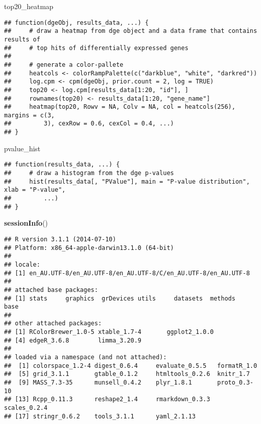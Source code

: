 \documentclass[]{article}
\newenvironment{Shaded}{\begin{snugshade}}{\end{snugshade}}
\newcommand{\KeywordTok}[1]{\textcolor[rgb]{0.13,0.29,0.53}{\textbf{{#1}}}}
\newcommand{\NormalTok}[1]{{#1}}
\begin{document}
\begin{Shaded}
\begin{Highlighting}[]
\NormalTok{top20_heatmap}
\end{Highlighting}
\end{Shaded}

\begin{verbatim}
## function(dgeObj, results_data, ...) {
##     # draw a heatmap from dge object and a data frame that contains results of
##     # top hits of differentially expressed genes
##     
##     # generate a color-pallete
##     heatcols <- colorRampPalette(c("darkblue", "white", "darkred"))
##     log.cpm <- cpm(dgeObj, prior.count = 2, log = TRUE)
##     top20 <- log.cpm[results_data[1:20, "id"], ]
##     rownames(top20) <- results_data[1:20, "gene_name"]
##     heatmap(top20, Rowv = NA, Colv = NA, col = heatcols(256), margins = c(3, 
##         3), cexRow = 0.6, cexCol = 0.4, ...)
## }
\end{verbatim}

\begin{Shaded}
\begin{Highlighting}[]
\NormalTok{pvalue_hist}
\end{Highlighting}
\end{Shaded}

\begin{verbatim}
## function(results_data, ...) {
##     # draw a histogram from the dge p-values
##     hist(results_data[, "PValue"], main = "P-value distribution", xlab = "P-value", 
##         ...)
## }
\end{verbatim}

\begin{Shaded}
\begin{Highlighting}[]
\KeywordTok{sessionInfo}\NormalTok{()}
\end{Highlighting}
\end{Shaded}

\begin{verbatim}
## R version 3.1.1 (2014-07-10)
## Platform: x86_64-apple-darwin13.1.0 (64-bit)
## 
## locale:
## [1] en_AU.UTF-8/en_AU.UTF-8/en_AU.UTF-8/C/en_AU.UTF-8/en_AU.UTF-8
## 
## attached base packages:
## [1] stats     graphics  grDevices utils     datasets  methods   base     
## 
## other attached packages:
## [1] RColorBrewer_1.0-5 xtable_1.7-4       ggplot2_1.0.0     
## [4] edgeR_3.6.8        limma_3.20.9      
## 
## loaded via a namespace (and not attached):
##  [1] colorspace_1.2-4 digest_0.6.4     evaluate_0.5.5   formatR_1.0     
##  [5] grid_3.1.1       gtable_0.1.2     htmltools_0.2.6  knitr_1.7       
##  [9] MASS_7.3-35      munsell_0.4.2    plyr_1.8.1       proto_0.3-10    
## [13] Rcpp_0.11.3      reshape2_1.4     rmarkdown_0.3.3  scales_0.2.4    
## [17] stringr_0.6.2    tools_3.1.1      yaml_2.1.13
\end{verbatim}
\end{document}
